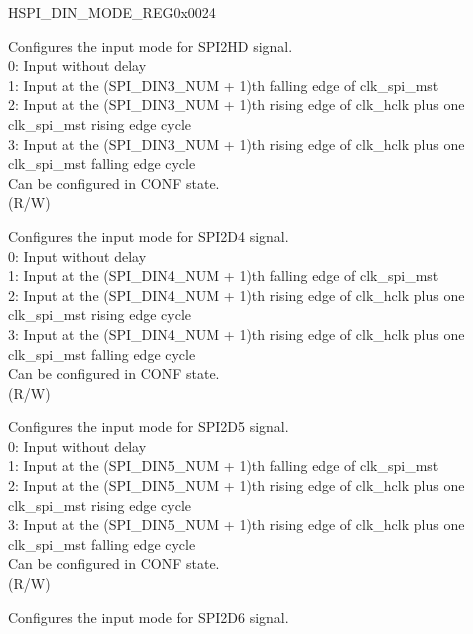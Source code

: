 \addtocounter{Regfloat}{-1}
\begin{register}{H}{SPI\_DIN\_MODE\_REG}{0x0024}
\begin{regdesc}\begin{reglist}
\item [Continued from the previous page...]
\label{fielddesc:SPIDIN3MODE}\item [SPI\_DIN3\_MODE] Configures the input mode for SPI2HD signal.\\
0: Input without delay\\
1: Input at the (SPI\_DIN3\_NUM + 1)th falling edge of clk\_spi\_mst\\
2: Input at the (SPI\_DIN3\_NUM + 1)th rising edge of clk\_hclk plus one clk\_spi\_mst rising edge cycle\\
3: Input at the (SPI\_DIN3\_NUM + 1)th rising edge of clk\_hclk plus one clk\_spi\_mst falling edge cycle\\
Can be configured in CONF state. \\
 (R/W)
\label{fielddesc:SPIDIN4MODE}\item [SPI\_DIN4\_MODE] Configures the input mode for SPI2D4 signal.\\
0: Input without delay\\
1: Input at the (SPI\_DIN4\_NUM + 1)th falling edge of clk\_spi\_mst\\
2: Input at the (SPI\_DIN4\_NUM + 1)th rising edge of clk\_hclk plus one clk\_spi\_mst rising edge cycle\\
3: Input at the (SPI\_DIN4\_NUM + 1)th rising edge of clk\_hclk plus one clk\_spi\_mst falling edge cycle\\
Can be configured in CONF state.\\
(R/W)
\label{fielddesc:SPIDIN5MODE}\item [SPI\_DIN5\_MODE] Configures the input mode for SPI2D5 signal.\\
0: Input without delay\\
1: Input at the (SPI\_DIN5\_NUM + 1)th falling edge of clk\_spi\_mst\\
2: Input at the (SPI\_DIN5\_NUM + 1)th rising edge of clk\_hclk plus one clk\_spi\_mst rising edge cycle\\
3: Input at the (SPI\_DIN5\_NUM + 1)th rising edge of clk\_hclk plus one clk\_spi\_mst falling edge cycle\\
Can be configured in CONF state. \\
(R/W)
\label{fielddesc:SPIDIN6MODE}\item [SPI\_DIN6\_MODE] Configures the input mode for SPI2D6 signal.\\

\end{reglist}
\end{regdesc}
\end{register}
